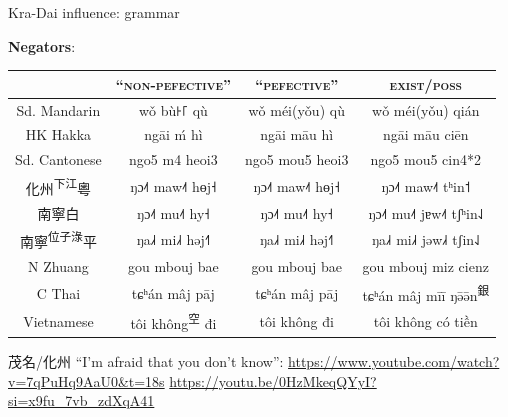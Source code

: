 \documentclass{beamer}
\begin{document}
\begin{frame}[fragile]{Kra-Dai influence: grammar}

{\small \textbf{Negators}:}\\
\medskip
{\footnotesize
\begin{tabular}{c|c c c}
     & \enquote{\textsc{non-pefective}} & \enquote{\textsc{pefective}} & \textsc{exist/poss}\\ \hline
    Sd. Mandarin & \multicolumn{1}{c|}{wǒ bù꜔꜒ qù} & wǒ méi(yǒu) qù & wǒ méi(yǒu) qián\\
    HK Hakka & \multicolumn{1}{c|}{ngāi ḿ hì} & ngāi māu hì & ngāi māu ciēn\\
    Sd. Cantonese & \multicolumn{1}{c|}{ngo5 m4 heoi3} & ngo5 mou5 heoi3 & ngo5 mou5 cin4*2\\ \hline
    化州\textsuperscript{下江}粵 & ŋɔ˨˦ maw˨˦ hɵj˧ & ŋɔ˨˦ maw˨˦ hɵj˧ & ŋɔ˨˦ maw˨˦ tʰin˦\\ \hline
    南寧白 & ŋɔ˨˦ mu˨˦ hy˧ & ŋɔ˨˦ mu˨˦ hy˧ & \multicolumn{1}{|c}{ŋɔ˨˦ mu˨˦ jɐw˨˦ tʃʰin˨˩}\\
    南寧\textsuperscript{位子淥}平 & ŋa˩˧ mi˩˧ həj˧˥ & ŋa˩˧ mi˩˧ həj˧˥ & \multicolumn{1}{|c}{ŋa˩˧ mi˩˧ jəw˩˧ tʃin˨˩}\\
    N Zhuang & gou mbouj bae & gou mbouj bae & \multicolumn{1}{|c}{gou mbouj miz cienz}\\
    C Thai & tɕʰán mâj pāj & tɕʰán mâj pāj & \multicolumn{1}{|c}{tɕʰán mâj mīī ŋə̄ə̄n\textsuperscript{銀}}\\
    Vietnamese & tôi không\textsuperscript{空} đi & tôi không đi & \multicolumn{1}{|c}{tôi không có tiền}\\
\end{tabular}
}
\vfill {} {\tiny 茂名/化州 \enquote{I'm afraid that you don't know}: \url{https://www.youtube.com/watch?v=7qPuHq9AaU0&t=18s} \url{https://youtu.be/0HzMkeqQYyI?si=x9fu_7vb_zdXqA41}}\par
\end{frame}
\end{document}
